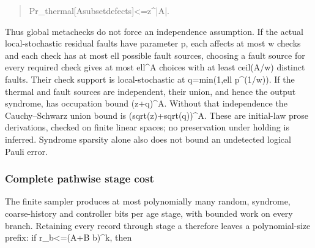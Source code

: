 \documentclass[
]{article}
\begin{document}
\begin{quote}\small\ttfamily\raggedright\setlength{\parskip}{0pt}
\noindent P\allowbreak{}r\allowbreak{}\_\allowbreak{}t\allowbreak{}h\allowbreak{}e\allowbreak{}r\allowbreak{}m\allowbreak{}a\allowbreak{}l\allowbreak{}[\allowbreak{}A\allowbreak{}\hspace*{0.525em}\allowbreak{}s\allowbreak{}u\allowbreak{}b\allowbreak{}s\allowbreak{}e\allowbreak{}t\allowbreak{}\hspace*{0.525em}\allowbreak{}d\allowbreak{}e\allowbreak{}f\allowbreak{}e\allowbreak{}c\allowbreak{}t\allowbreak{}s\allowbreak{}]\allowbreak{}\hspace*{0.525em}\allowbreak{}<\allowbreak{}=\allowbreak{}\hspace*{0.525em}\allowbreak{}z\allowbreak{}\^{}\allowbreak{}|\allowbreak{}A\allowbreak{}|\allowbreak{}.\par
\end{quote}

Thus global metachecks do not force an independence assumption. If the
actual local-stochastic residual faults have parameter p, each affects
at most w checks and each check has at most ell possible fault sources,
choosing a fault source for every required check gives at most
ell\^{}\textbar A\textbar{} choices with at least
ceil(\textbar A\textbar/w) distinct faults. Their check support is
local-stochastic at q=min(1,ell p\^{}(1/w)). If the thermal and fault
sources are independent, their union, and hence the output syndrome, has
occupation bound (z+q)\^{}\textbar A\textbar. Without that independence
the Cauchy--Schwarz union bound is
(sqrt(z)+sqrt(q))\^{}\textbar A\textbar. These are initial-law prose
derivations, checked on finite linear spaces; no preservation under
holding is inferred. Syndrome sparsity alone also does not bound an
undetected logical Pauli error.

\subsubsection{Complete pathwise stage
cost}\label{complete-pathwise-stage-cost}

The finite sampler produces at most polynomially many random, syndrome,
coarse-history and controller bits per age stage, with bounded work on
every branch. Retaining every record through stage a therefore leaves a
polynomial-size prefix: if r\_b\textless=(A+B b)\^{}k, then
\end{document}
